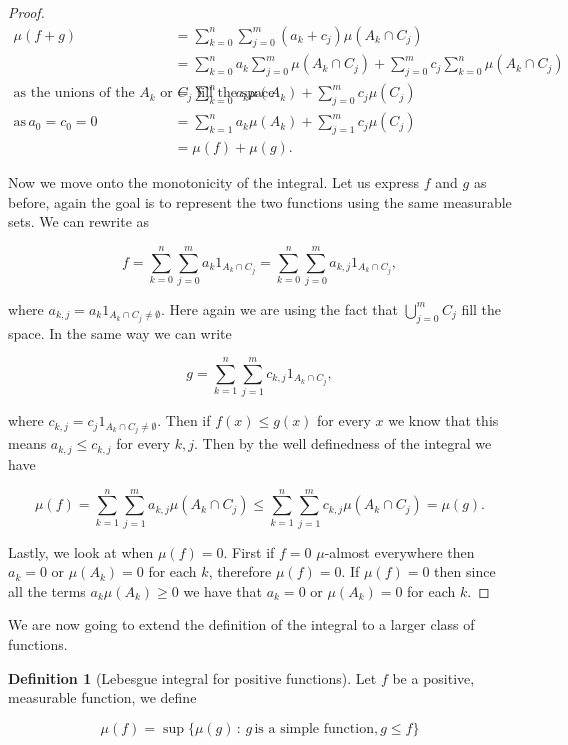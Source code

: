 \documentclass[
]{book}
\theoremstyle{definition}
\newtheorem{definition}{Definition}[chapter]
\theoremstyle{definition}
\theoremstyle{definition}
\theoremstyle{definition}
\theoremstyle{remark}
\begin{document}
\begin{proof}
\begin{align*}
\mu(f+g) &= \sum_{k=0}^n \sum_{j=0}^m (a_k +c_j) \mu(A_k \cap C_j)\\
&= \sum_{k=0}^n a_k \sum_{j=0}^m \mu(A_k \cap C_j) + \sum_{j=0}^m c_j \sum_{k=0}^n \mu(A_k \cap C_j) \\
\mbox{as the unions of the $A_k$ or $C_j$ fill the space} \quad & = \sum_{k=0}^n a_k \mu(A_k) + \sum_{j=0}^m c_j \mu(C_j)\\
\mbox{as}\, a_0 = c_0 =0 \quad & = \sum_{k=1}^n a_k \mu(A_k) + \sum_{j=1}^m c_j \mu(C_j) \\
& = \mu(f) + \mu(g).
\end{align*}

Now we move onto the monotonicity of the integral. Let us express \(f\) and \(g\) as before, again the goal is to represent the two functions using the same measurable sets. We can rewrite as

\[ f = \sum_{k=0}^n \sum_{j=0}^m a_k 1_{A_k \cap C_j} = \sum_{k=0}^n \sum_{j=0}^m a_{k,j}1_{A_k \cap C_j},\]

where \(a_{k,j} = a_k 1_{A_k \cap C_j \neq \emptyset}\). Here again we are using the fact that \(\bigcup_{j=0}^m C_j\) fill the space. In the same way we can write

\[ g = \sum_{k=1}^n \sum_{j=1}^m c_{k,j}1_{A_k \cap C_j}, \]

where \(c_{k,j} = c_j 1_{A_k \cap C_j \neq \emptyset}\). Then if \(f(x) \leq g(x)\) for every \(x\) we know that this means \(a_{k,j} \leq c_{k,j}\) for every \(k,j\). Then by the well definedness of the integral we have

\[ \mu(f) = \sum_{k=1}^n \sum_{j=1}^m a_{k,j} \mu(A_k \cap C_j) \leq \sum_{k=1}^n \sum_{j=1}^m c_{k,j} \mu(A_k \cap C_j) = \mu(g).\]

Lastly, we look at when \(\mu(f)=0\). First if \(f=0\) \(\mu\)-almost everywhere then \(a_k=0\) or \(\mu(A_k)=0\) for each \(k\), therefore \(\mu(f)=0\). If \(\mu(f) =0\) then since all the terms \(a_k \mu(A_k) \geq 0\) we have that \(a_k=0\) or \(\mu(A_k) =0\) for each \(k\).
\end{proof}

We are now going to extend the definition of the integral to a larger class of functions.

\begin{definition}[Lebesgue integral for positive functions]
Let \(f\) be a positive, measurable function, we define

\[ \mu(f) = \sup \{ \mu(g)\, :\, g \, \mbox{is a simple function}, g \leq f\} \]
\end{definition}
\end{document}
